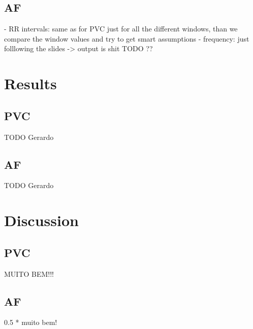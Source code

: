 \documentclass[a4paper,titlepage]{article}
\begin{document}
\subsection{AF}
- RR intervals: same as for PVC just for all the different windows, than we compare the window values and try to get smart assumptions
- frequency: just folllowing the slides -> output is shit TODO ??

\section{Results}

\subsection{PVC}
TODO Gerardo

\subsection{AF}
TODO Gerardo

\section{Discussion}

\subsection{PVC}
MUITO BEM!!!

\subsection{AF}
0.5 * muito bem!
\end{document}
